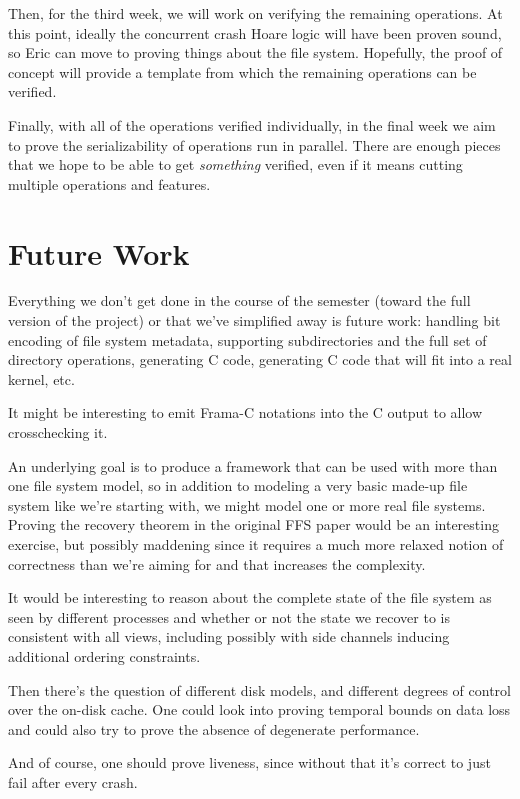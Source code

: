 \documentclass[11pt, twocolumn, letterpaper]{article}
\begin{document}
Then, for the third week, we will work on verifying the remaining operations.
At this point, ideally the concurrent crash Hoare logic will have been proven
sound, so Eric can move to proving things about the file system. Hopefully, the
proof of concept will provide a template from which the remaining operations can
be verified.

Finally, with all of the operations verified individually, in the final week we
aim to prove the serializability of operations run in parallel. There are enough
pieces that we hope to be able to get \textit{something} verified, even if it
means cutting multiple operations and features.

\section{Future Work}


Everything we don't get done in the course of the semester (toward the
full version of the project) or that we've simplified away is future
work: handling bit encoding of file system metadata, supporting
subdirectories and the full set of directory operations, generating C
code, generating C code that will fit into a real kernel, etc.

It might be interesting to emit Frama-C notations into the C output to
allow crosschecking it.

An underlying goal is to produce a framework that can be
used with more than one file system model, so in addition to modeling
a very basic made-up file system like we're starting with, we might
model one or more real file systems.
Proving the recovery theorem in the original FFS paper would be an
interesting exercise, but possibly maddening since it requires a much
more relaxed notion of correctness than we're aiming for and that
increases the complexity.

It would be interesting to reason about the complete state of the
file system as seen by different processes and whether or not the
state we recover to is consistent with all views, including possibly
with side channels inducing additional ordering
constraints.

Then there's the question of different disk models, and different degrees of
control over the on-disk cache.  One could look into proving temporal bounds on
data loss and could also try to prove the absence of degenerate performance.

And of course, one should prove liveness, since without that it's
correct to just fail after every crash.

%
%
\end{document}
